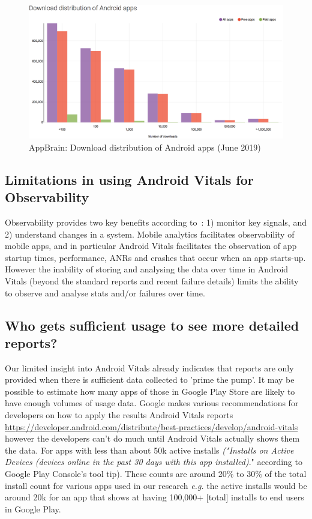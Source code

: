 \begin{figure}[!htbp]
    \centering
    \includegraphics[width=\textwidth, keepaspectratio]{images/appbrain/AppBrain_Download_Statistics_20-Jun-2019.png}
    \caption{AppBrain: Download distribution of Android apps (June 2019)}
    \label{fig:appbrain_download_statistics_jun_2019}
\end{figure}

\subsection{Limitations in using Android Vitals for Observability}
Observability provides two key benefits according to~\citealp{lightstephq2021_observability_will_never_replace_monitoring}: 1) monitor key signals, and 2) understand changes in a system. Mobile analytics facilitates observability of mobile apps, and in particular Android Vitals facilitates the observation of app startup times, performance, ANRs and crashes that occur when an app starts-up. However the inability of storing and analysing the data over time in Android Vitals (beyond the standard reports and recent failure details) limits the ability to observe and analyse stats and/or failures over time.



\subsection{Who gets sufficient usage to see more detailed reports?}
Our limited insight into Android Vitals already indicates that reports are only provided when there is sufficient data collected to 'prime the pump'. It may be possible to estimate how many apps of those in Google Play Store are likely to have enough volumes of usage data. Google makes various recommendations for developers on how to apply the results Android Vitals reports \url{https://developer.android.com/distribute/best-practices/develop/android-vitals} however the developers can't do much until Android Vitals actually shows them the data. For apps with less than about 50k active installs \textit{("Installs on Active Devices (devices online in the past 30 days with this app installed)}." according to Google Play Console's tool tip). These counts are around 20\% to 30\% of the total install count for various apps used in our research \textit{e.g.} the active installs would be around 20k for an app that shows at having 100,000+ [total] installs to end users in Google Play.

